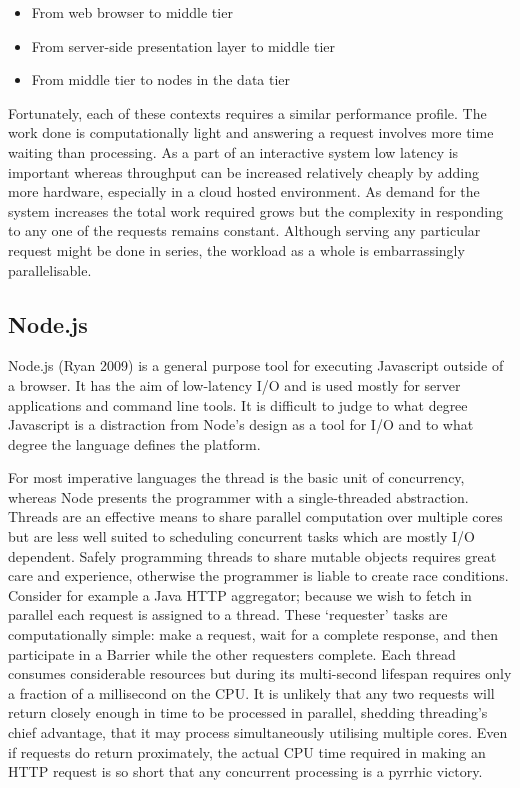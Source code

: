 \documentclass[12pt, ]{article}
\begin{document}
\begin{itemize}
\itemsep1pt\parskip0pt
\item
  From web browser to middle tier
\item
  From server-side presentation layer to middle tier
\item
  From middle tier to nodes in the data tier
\end{itemize}

Fortunately, each of these contexts requires a similar performance
profile. The work done is computationally light and answering a request
involves more time waiting than processing. As a part of an interactive
system low latency is important whereas throughput can be increased
relatively cheaply by adding more hardware, especially in a cloud hosted
environment. As demand for the system increases the total work required
grows but the complexity in responding to any one of the requests
remains constant. Although serving any particular request might be done
in series, the workload as a whole is embarrassingly parallelisable.

\subsection{Node.js}\label{node.js}

Node.js (Ryan 2009) is a general purpose tool for executing Javascript
outside of a browser. It has the aim of low-latency I/O and is used
mostly for server applications and command line tools. It is difficult
to judge to what degree Javascript is a distraction from Node's design
as a tool for I/O and to what degree the language defines the platform.

For most imperative languages the thread is the basic unit of
concurrency, whereas Node presents the programmer with a single-threaded
abstraction. Threads are an effective means to share parallel
computation over multiple cores but are less well suited to scheduling
concurrent tasks which are mostly I/O dependent. Safely programming
threads to share mutable objects requires great care and experience,
otherwise the programmer is liable to create race conditions. Consider
for example a Java HTTP aggregator; because we wish to fetch in parallel
each request is assigned to a thread. These `requester' tasks are
computationally simple: make a request, wait for a complete response,
and then participate in a Barrier while the other requesters complete.
Each thread consumes considerable resources but during its multi-second
lifespan requires only a fraction of a millisecond on the CPU. It is
unlikely that any two requests will return closely enough in time to be
processed in parallel, shedding threading's chief advantage, that it may
process simultaneously utilising multiple cores. Even if requests do
return proximately, the actual CPU time required in making an HTTP
request is so short that any concurrent processing is a pyrrhic victory.
\end{document}
